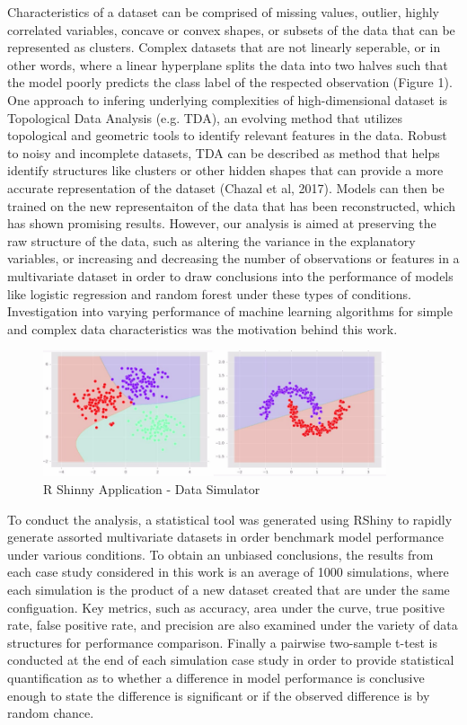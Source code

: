 \documentclass{llncs}
\begin{document}
Characteristics of a dataset can be comprised of missing values, outlier, highly correlated variables, concave or convex shapes, or subsets of the data that can be represented as clusters. Complex datasets that are not linearly seperable, or in other words, where a linear hyperplane splits the data into two halves such that the model poorly predicts the class label of the respected observation (Figure 1). One approach to infering underlying complexities of high-dimensional dataset is Topological Data Analysis (e.g. TDA), an evolving method that utilizes topological and geometric tools to identify relevant features in the data. Robust to noisy and incomplete datasets, TDA can be described as method that helps identify structures like clusters or other hidden shapes that can provide a more accurate representation of the dataset (Chazal et al, 2017). Models can then be trained on the new representaiton of the data that has been reconstructed, which has shown promising results. However, our analysis is aimed at preserving the raw structure of the data, such as altering the variance in the explanatory variables, or increasing and decreasing the number of observations or features in a multivariate dataset in order to draw conclusions into the performance of models like logistic regression and random forest under these types of conditions. Investigation into varying performance of machine learning algorithms for simple and complex data characteristics was the motivation behind this work. 

\begin{figure}
\centering
\includegraphics[width=0.9\textwidth]{decisionboundry.png}
\caption{R Shinny Application - Data Simulator}
\end{figure}


To conduct the analysis, a statistical tool was generated using RShiny to rapidly generate assorted multivariate datasets in order benchmark model performance under various conditions. To obtain an unbiased conclusions, the results from each case study considered in this work is an average of 1000 simulations, where each simulation is the product of a new dataset created that are under the same configuation. Key metrics, such as accuracy, area under the curve, true positive rate, false positive rate, and precision are also examined under the variety of data structures for performance comparison. Finally a pairwise two-sample t-test is conducted at the end of each simulation case study in order to provide statistical quantification as to whether a difference in model performance is conclusive enough to state the difference is significant or if the observed difference is by random chance. 
\end{document}
